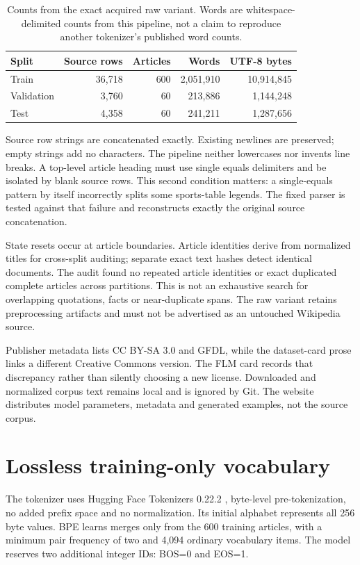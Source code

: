 \documentclass[10pt]{article}
\begin{document}
\begin{table}[ht]\centering
\begin{tabular}{lrrrr}\toprule
Split & Source rows & Articles & Words & UTF-8 bytes\\\midrule
Train & 36,718 & 600 & 2,051,910 & 10,914,845\\
Validation & 3,760 & 60 & 213,886 & 1,144,248\\
Test & 4,358 & 60 & 241,211 & 1,287,656\\\bottomrule
\end{tabular}
\caption{Counts from the exact acquired raw variant. Words are whitespace-delimited counts from this pipeline, not a claim to reproduce another tokenizer's published word counts.}
\end{table}

Source row strings are concatenated exactly. Existing newlines are preserved; empty strings add no characters. The pipeline neither lowercases nor invents line breaks. A top-level article heading must use single equals delimiters and be isolated by blank source rows. This second condition matters: a single-equals pattern by itself incorrectly splits some sports-table legends. The fixed parser is tested against that failure and reconstructs exactly the original source concatenation.

State resets occur at article boundaries. Article identities derive from normalized titles for cross-split auditing; separate exact text hashes detect identical documents. The audit found no repeated article identities or exact duplicated complete articles across partitions. This is not an exhaustive search for overlapping quotations, facts or near-duplicate spans. The raw variant retains preprocessing artifacts and must not be advertised as an untouched Wikipedia source.

Publisher metadata lists CC BY-SA 3.0 and GFDL, while the dataset-card prose links a different Creative Commons version. The FLM card records that discrepancy rather than silently choosing a new license. Downloaded and normalized corpus text remains local and is ignored by Git. The website distributes model parameters, metadata and generated examples, not the source corpus.

\section{Lossless training-only vocabulary}
The tokenizer uses Hugging Face Tokenizers 0.22.2 \cite{tokenizers}, byte-level pre-tokenization, no added prefix space and no normalization. Its initial alphabet represents all 256 byte values. BPE learns merges only from the 600 training articles, with a minimum pair frequency of two and 4,094 ordinary vocabulary items. The model reserves two additional integer IDs: BOS=0 and EOS=1.
\end{document}
